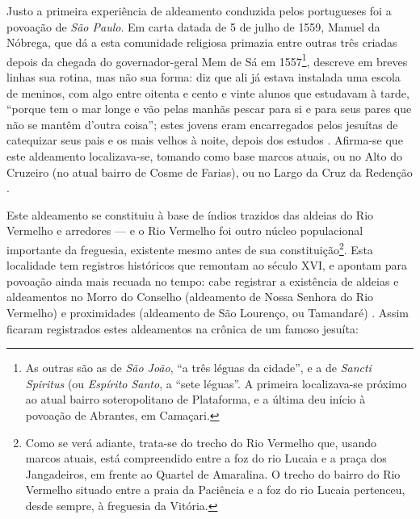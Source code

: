 Justo a primeira experiência de aldeamento conduzida pelos portugueses foi a povoação de \textit{São Paulo}. Em carta datada de 5 de julho de 1559, Manuel da Nóbrega, que dá a esta comunidade religiosa primazia entre outras três criadas depois da chegada do governador-geral Mem de Sá em 1557\footnote{As outras são as de \textit{São João}, ``a três léguas da cidade'', e a de \textit{Sancti Spiritus} (ou \textit{Espírito Santo}, a ``sete léguas''. A primeira localizava-se próximo ao atual bairro soteropolitano de Plataforma, e a última deu início à povoação de Abrantes, em Camaçari.}, descreve em breves linhas sua rotina, mas não sua forma: diz que ali já estava instalada uma escola de meninos, com algo entre oitenta e cento e vinte alunos que estudavam à tarde, ``porque tem o mar longe e vão pelas manhãs pescar para si e para seus pares que não se mantêm d'outra coisa''; estes jovens eram encarregados pelos jesuítas de catequizar seus pais e os mais velhos à noite, depois dos estudos \cite[p.~179]{nobrega_cartas_1931}. Afirma-se que este aldeamento localizava-se, tomando como base marcos atuais, ou no Alto do Cruzeiro (no atual bairro de Cosme de Farias), ou no Largo da Cruz da Redenção \cite[p.~87]{campos_brotas_1942}.

Este aldeamento se constituiu à base de índios trazidos das aldeias do Rio Vermelho e arredores --- e o Rio Vermelho foi outro núcleo populacional importante da freguesia, existente mesmo antes de sua constituição\footnote{Como se verá adiante, trata-se do trecho do Rio Vermelho que, usando marcos atuais, está compreendido entre a foz do rio Lucaia e a praça dos Jangadeiros, em frente ao Quartel de Amaralina. O trecho do bairro do Rio Vermelho situado entre a praia da Paciência e a foz do rio Lucaia pertenceu, desde sempre, à freguesia da Vitória.}. Esta localidade tem registros históricos que remontam ao século XVI, e apontam para povoação ainda mais recuada no tempo: cabe registrar a existência de aldeias e aldeamentos no Morro do Conselho (aldeamento de Nossa Senhora do Rio Vermelho) e proximidades (aldeamento de São Lourenço, ou Tamandaré) \cite[p.~75]{santos_salvador_2004}. Assim ficaram registrados estes aldeamentos na crônica de um famoso jesuíta:

